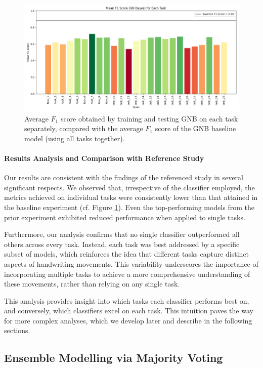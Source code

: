 \documentclass[a4paper, 11pt]{article}
\begin{document}
\begin{figure}[h!]
    \centering
    \includegraphics[width=\textwidth]{Figures/task-by-task.png}
    \caption{\footnotesize{Average $F_1$ score obtained by training and testing GNB on each task separately, compared with the average $F_1$ score of the GNB baseline model (using all tasks together).}}
    \label{fig:task-by-task}
\end{figure}

\paragraph{Results Analysis and Comparison with Reference Study}
Our results are consistent with the findings of the referenced study in several significant respects. We observed that, irrespective of the classifier employed, the metrics achieved on individual tasks were consistently lower than that attained in the baseline experiment (cf. Figure \ref{fig:task-by-task}). Even the top-performing models from the prior experiment exhibited reduced performance when applied to single tasks.

Furthermore, our analysis confirms that no single classifier outperformed all others across every task. Instead, each task was best addressed by a specific subset of models, which reinforces the idea that different tasks capture distinct aspects of handwriting movements. This variability underscores the importance of incorporating multiple tasks to achieve a more comprehensive understanding of these movements, rather than relying on any single task.

This analysis provides insight into which tasks each classifier performs best on, and conversely, which classifiers excel on each task. This intuition paves the way for more complex analyses, which we develop later and describe in the following sections.

\subsection{Ensemble Modelling via Majority Voting} \label{sec:majority-voting}
\end{document}
